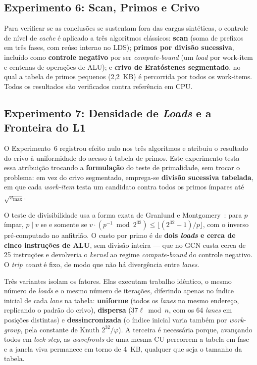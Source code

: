 \subsection{Experimento 6: Scan, Primos e Crivo}

Para verificar se as conclusões se sustentam fora das cargas sintéticas, o controle de nível de \textit{cache} é aplicado a três algoritmos clássicos: \textbf{scan} (soma de prefixos em três fases, com reúso interno no LDS); \textbf{primos por divisão sucessiva}, incluído como \textbf{controle negativo} por ser \textit{compute-bound} (um \textit{load} por work-item e centenas de operações de ALU); e \textbf{crivo de Eratóstenes segmentado}, no qual a tabela de primos pequenos (2,2~KB) é percorrida por todos os work-items. Todos os resultados são verificados contra referência em CPU.


\subsection{Experimento 7: Densidade de \textit{Loads} e a Fronteira do L1}

O Experimento~6 registrou efeito nulo nos três algoritmos e atribuiu o resultado do crivo à uniformidade do acesso à tabela de primos. Este experimento testa essa atribuição trocando a \textbf{formulação} do teste de primalidade, sem trocar o problema: em vez do crivo segmentado, emprega-se \textbf{divisão sucessiva tabelada}, em que cada \textit{work-item} testa um candidato contra todos os primos ímpares até $\sqrt{v_{\max}}$.

O teste de divisibilidade usa a forma exata de Granlund e Montgomery~\cite{granlund1994}: para $p$ ímpar, $p \mid v$ se e somente se $v \cdot (p^{-1} \bmod 2^{32}) \le \lfloor (2^{32}-1)/p \rfloor$, com o inverso pré-computado no anfitrião. O custo por primo é de \textbf{dois \textit{loads} e cerca de cinco instruções de ALU}, sem divisão inteira --- que no GCN custa cerca de 25 instruções e devolveria o \textit{kernel} ao regime \textit{compute-bound} do controle negativo. O \textit{trip count} é fixo, de modo que não há divergência entre \textit{lanes}.

Três variantes isolam os fatores. Elas executam trabalho idêntico, o mesmo número de \textit{loads} e o mesmo número de iterações, diferindo apenas no índice inicial de cada \textit{lane} na tabela: \textbf{uniforme} (todos os \textit{lanes} no mesmo endereço, replicando o padrão do crivo), \textbf{dispersa} ($37\ell \bmod n$, com os 64 \textit{lanes} em posições distintas) e \textbf{dessincronizada} (o índice inicial varia também por \textit{work-group}, pela constante de Knuth $2^{32}/\varphi$). A terceira é necessária porque, avançando todos em \textit{lock-step}, as \textit{wavefronts} de uma mesma CU percorrem a tabela em fase e a janela viva permanece em torno de 4~KB, qualquer que seja o tamanho da tabela.

